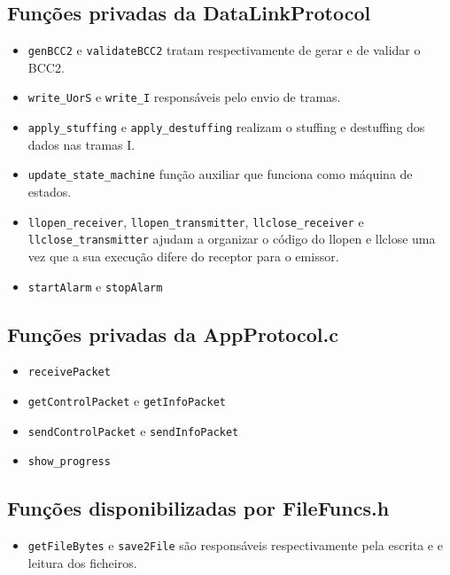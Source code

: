 \documentclass[11pt,a4paper,reqno]{report}
\numberwithin{equation}{section}
\begin{document}
\subsection{Funções privadas da DataLinkProtocol}
\begin{itemize}
\item \verb|genBCC2| e \verb|validateBCC2| tratam respectivamente de gerar e de validar o BCC2.
\item \verb|write_UorS| e \verb|write_I| responsáveis pelo envio de tramas.
\item \verb|apply_stuffing| e \verb|apply_destuffing| realizam o stuffing e destuffing dos dados nas tramas I.
\item \verb|update_state_machine| função auxiliar que funciona como máquina de estados.
\item \verb|llopen_receiver|, \verb|llopen_transmitter|, \verb|llclose_receiver| e \verb|llclose_transmitter| ajudam a organizar o código do llopen e llclose uma vez que a sua execução difere do receptor para o emissor.
\item \verb|startAlarm| e \verb|stopAlarm|
\end{itemize}

\subsection{Funções privadas da AppProtocol.c}
\begin{itemize}
\item \verb|receivePacket|
\item \verb|getControlPacket| e \verb|getInfoPacket|
\item \verb|sendControlPacket| e \verb|sendInfoPacket|
\item \verb|show_progress|
\end{itemize}

\subsection{Funções disponibilizadas por FileFuncs.h}
\begin{itemize}
\item \verb|getFileBytes| e \verb|save2File| são responsáveis respectivamente pela escrita e e leitura dos ficheiros.
\end{itemize}

\end{document}
